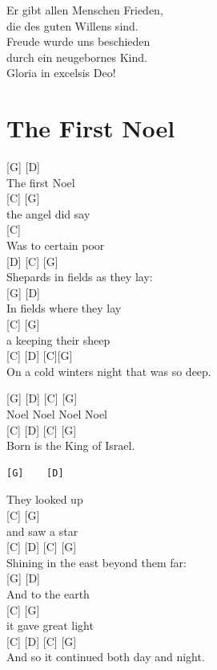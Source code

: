 \documentclass[
  letterpaper,
]{scrbook}
\begin{document}
Er gibt allen Menschen Frieden,\\
die des guten Willens sind.\\
Freude wurde uns beschieden\\
durch ein neugebornes Kind.\\
Gloria in excelsis Deo!

\hypertarget{the-first-noel}{%
\chapter{The First Noel}\label{the-first-noel}}

{[}G{]} {[}D{]}\\
The first Noel\\
{[}C{]} {[}G{]}\\
the angel did say\\
{[}C{]}\\
Was to certain poor\\
{[}D{]} {[}C{]} {[}G{]}\\
Shepards in fields as they lay:\\
{[}G{]} {[}D{]}\\
In fields where they lay\\
{[}C{]} {[}G{]}\\
a keeping their sheep\\
{[}C{]} {[}D{]} {[}C{]}{[}G{]}\\
On a cold winter\textquotesingle s night that was so deep.

{[}G{]} {[}D{]} {[}C{]} {[}G{]}\\
Noel Noel Noel Noel\\
{[}C{]} {[}D{]} {[}C{]} {[}G{]}\\
Born is the King of Israel.

\begin{verbatim}
[G]    [D]  
\end{verbatim}

They looked up\\
{[}C{]} {[}G{]}\\
and saw a star\\
{[}C{]} {[}D{]} {[}C{]} {[}G{]}\\
Shining in the east beyond them far:\\
{[}G{]} {[}D{]}\\
And to the earth\\
{[}C{]} {[}G{]}\\
it gave great light\\
{[}C{]} {[}D{]} {[}C{]} {[}G{]}\\
And so it continued both day and night.
\end{document}
